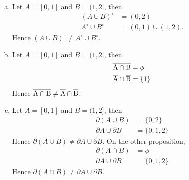 \begin{Exercise}
\begin{enumerate}[a)]
\item 
\begin{solution}
Let $A=[0,1]$ and $B=(1,2]$, then
\begin{align*}
(A\cup B)^\circ &= (0,2) \\
A^\circ \cup B^\circ &= (0,1)\cup(1,2).
\end{align*}
Hence $(A\cup B)^\circ \neq A^\circ \cup B^\circ$.
\end{solution}

\item 
\begin{solution}
Let $A=[0,1]$ and $B=(1,2]$, then
\begin{align*}
\overline{\rm A\cap B} &= \phi \\
\overline{\rm A}\cap \overline{\rm B} &= \{1\}
\end{align*}
Hence $\overline{\rm A\cap B} \neq \overline{\rm A}\cap \overline{\rm B}$.
\end{solution}

\item 
\begin{solution}
Let $A=[0,1]$ and $B=(1,2]$, then
\begin{align*}
\partial (A\cup B) &= \{0,2\} \\
\partial A\cup \partial B &= \{0,1,2\}
\end{align*}
Hence $\partial (A\cup B) \neq \partial A\cup \partial B$. On the other proposition,
\begin{align*}
\partial (A\cap B) &= \phi \\
\partial A\cup \partial B &= \{0,1,2\}
\end{align*}
Hence $\partial (A\cap B) \neq \partial A\cup \partial B$.
\end{solution}

\end{enumerate}
\end{Exercise}